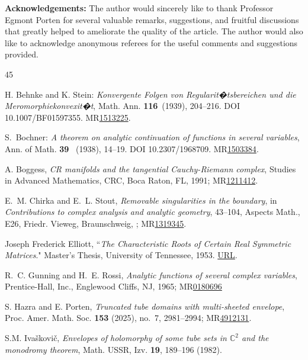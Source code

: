 \documentclass[12pt,reqno, a4paper]{amsart}
\theoremstyle{definition}
\theoremstyle{definition}
\numberwithin{equation}{section}
\def\C{\mathbb{C}}                              %
\begin{document}
\textbf{Acknowledgements:} The author would sincerely like to thank Professor Egmont Porten
for several valuable remarks, suggestions, and fruitful discussions that greatly helped to ameliorate the quality of the article. The author would also like to acknowledge anonymous referees for the useful comments and suggestions provided.



\begin{thebibliography}{45}

 H. Behnke and K. Stein: \textit{Konvergente Folgen von Regularit�tsbereichen und die Meromorphiekonvexit�t}, Math. Ann. \textbf{116}~(1939), 204--216. DOI 10.1007/BF01597355. MR\href{https://mathscinet.ams.org/mathscinet/article?mr=1513225}{1513225}.

	
 S.~Bochner: \textit{A theorem on analytic continuation of functions in several variables},
Ann. of Math. {\bf 39}~ (1938), 14--19. DOI 10.2307/1968709. MR\href{https://mathscinet.ams.org/mathscinet/article?mr=1503384}{1503384}.

 A. Boggess, {\it CR manifolds and the tangential Cauchy-Riemann complex}, Studies in Advanced Mathematics, CRC, Boca Raton, FL, 1991; MR\href{https://mathscinet.ams.org/mathscinet/article?mr=1211412}{1211412}.
	
 E.~M. Chirka and E.~L. Stout, \textit{Removable singularities in the boundary}, in {\it Contributions to complex analysis and analytic geometry}, 43--104, Aspects Math., E26, Friedr. Vieweg, Braunschweig, ; MR\href{https://mathscinet.ams.org/mathscinet/article?mr=1319345}{1319345}.


 Joseph Frederick Elliott, ``\textit{The Characteristic Roots of Certain Real Symmetric Matrices}." Master's Thesis, University of Tennessee, 1953. \href{https://trace.tennessee.edu/cgi/viewcontent.cgi?article=3834&context=utk_gradthes }{URL}. 


 R.~C. Gunning and H.~E. Rossi, {\it Analytic functions of several complex variables}, Prentice-Hall, Inc., Englewood Cliffs, NJ, 1965; MR\href{https://mathscinet.ams.org/mathscinet/article?mr=180696}{0180696}

 S. Hazra and E. Porten, \textit{Truncated tube domains with multi-sheeted envelope}, Proc. Amer. Math. Soc. {\bf 153} (2025), no.~7, 2981--2994; MR\href{https://mathscinet.ams.org/mathscinet/article?mr=4912131}{4912131}.


  S.M. Iva\v skovi\v c, \textit{Envelopes of holomorphy of some tube sets in $\C^2$ and the monodromy theorem}, Math. USSR, Izv. \textbf{19}, 189--196 (1982).


\end{thebibliography}
\end{document}
